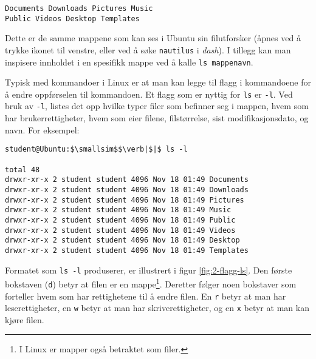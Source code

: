 \begin{alphasection}
\begin{lstlisting}[mathescape=true]
Documents Downloads Pictures Music
Public Videos Desktop Templates
\end{lstlisting}


Dette er de samme mappene som kan ses i Ubuntu sin filutforsker (åpnes ved å trykke ikonet til venstre, eller ved å søke \verb|nautilus| i \textit{dash}). I tillegg kan man inspisere innholdet i en spesifikk mappe ved å kalle \verb|ls mappenavn|.

Typisk med kommandoer i Linux er at man kan legge til flagg i kommandoene for å endre oppførselen til kommandoen. Et flagg som er nyttig for \verb|ls| er \verb|-l|. Ved bruk av \verb|-l|, listes det opp hvilke typer filer som befinner seg i mappen, hvem som har brukerrettigheter, hvem som eier filene, filstørrelse, sist modifikasjonsdato, og navn. For eksempel:

\newpage

\begin{lstlisting}[mathescape=true]
student@Ubuntu:$\smallsim$$\verb|$|$ ls -l

total 48
drwxr-xr-x 2 student student 4096 Nov 18 01:49 Documents
drwxr-xr-x 2 student student 4096 Nov 18 01:49 Downloads
drwxr-xr-x 2 student student 4096 Nov 18 01:49 Pictures
drwxr-xr-x 2 student student 4096 Nov 18 01:49 Music
drwxr-xr-x 2 student student 4096 Nov 18 01:49 Public
drwxr-xr-x 2 student student 4096 Nov 18 01:49 Videos
drwxr-xr-x 2 student student 4096 Nov 18 01:49 Desktop
drwxr-xr-x 2 student student 4096 Nov 18 01:49 Templates
\end{lstlisting}

Formatet som \verb|ls -l| produserer, er illustrert i figur \ref{fig:2-flagg-ls}. Den første bokstaven (\verb|d|) betyr at filen er en mappe\footnote{I Linux er mapper også betraktet som filer.}. Deretter følger noen bokstaver som forteller hvem som har rettighetene til å endre filen. En \verb|r| betyr at man har leserettigheter, en \verb|w| betyr at man har skriverettigheter, og en \verb|x| betyr at man kan kjøre filen.

\begin{figure}[ht]
    \centering
    


\begin{tikzpicture}[x=0.75pt,y=0.75pt,yscale=-1,xscale=1]


\end{tikzpicture}
\end{figure}
\end{alphasection}
